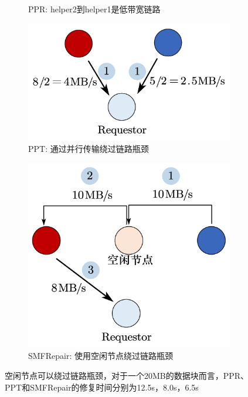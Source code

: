 \begin{figure}[tb!]
\begin{subfigure}[t]{0.4\textwidth}
		\caption{PPR: helper2到helper1是低带宽链路}
		\label{fig:2.3-2}
	\end{subfigure}
	\begin{subfigure}[t]{0.4\textwidth}
		\centering
		\includegraphics[scale=0.3]{figures/2.3-3.pdf}
		\caption{PPT: 通过并行传输绕过链路瓶颈}
		\label{fig:2.3-3}
	\end{subfigure}
	\begin{subfigure}[t]{0.4\textwidth}
		\centering
		\includegraphics[scale=0.3]{figures/2.3-4.pdf}
		\caption{SMFRepair: 使用空闲节点绕过链路瓶颈}
		\label{fig:2.3-4}
	\end{subfigure}
	\caption{空闲节点可以绕过链路瓶颈，对于一个20MB的数据块而言，PPR、PPT和SMFRepair的修复时间分别为12.5s，8.0s，6.5s}
	\label{fig:2.3}
\end{figure}
